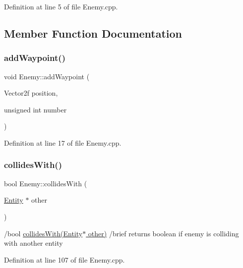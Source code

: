 Definition at line 5 of file Enemy.\+cpp.



\subsection{Member Function Documentation}
\mbox{\label{class_enemy_a5b54ac52247fc27b4860c04e8f1464d9}} 
\subsubsection{\texorpdfstring{add\+Waypoint()}{addWaypoint()}}
{\footnotesize\ttfamily void Enemy\+::add\+Waypoint (\begin{DoxyParamCaption}\item[{Vector2f}]{position,  }\item[{unsigned int}]{number }\end{DoxyParamCaption})}



Definition at line 17 of file Enemy.\+cpp.

\mbox{\label{class_enemy_aa50adebfe1bd8b83a6a0571f3635c932}} 
\subsubsection{\texorpdfstring{collides\+With()}{collidesWith()}}
{\footnotesize\ttfamily bool Enemy\+::collides\+With (\begin{DoxyParamCaption}\item[{\hyperlink{class_entity}{Entity} $\ast$}]{other }\end{DoxyParamCaption})}

/bool \hyperlink{class_enemy_aa50adebfe1bd8b83a6a0571f3635c932}{collides\+With(\+Entity$\ast$ other)} /brief returns boolean if enemy is colliding with another entity 

Definition at line 107 of file Enemy.\+cpp.

\mbox{\label{class_enemy_a9c48b3be7c2ebbb7dce8b45183299895}} 

